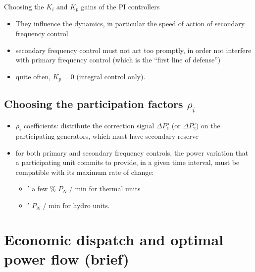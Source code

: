 \begin{frame}{Choosing the $K_i$ and $K_p$ gains of the PI controllers}
    \begin{itemize}
        \item They influence the dynamics, in particular the speed of action of secondary frequency control 
        \item secondary frequency control must not act too promptly, in order not interfere with primary frequency control (which is the “first line of defense”) 
        \item quite often, $K_p = 0$ (integral control only).
    \end{itemize}
    \subsection*{Choosing the participation factors $\rho_i$}
    \begin{itemize}
        \item $\rho_i$ coefficients: distribute the correction signal $\Delta P_1^o$ (or $\Delta P_2^o$) on the participating generators, which must have secondary reserve 
        \item for both primary and secondary frequency controls, the power variation that a participating unit commits to provide, in a given time interval, must be compatible with its maximum rate of change: 
        \begin{itemize}
            \item ' a few \% $P_N$ / min for thermal units 
            \item ' $P_N$ / min for hydro units.
        \end{itemize}
    \end{itemize}
\end{frame}




\section{Economic dispatch and optimal power flow (brief)}


